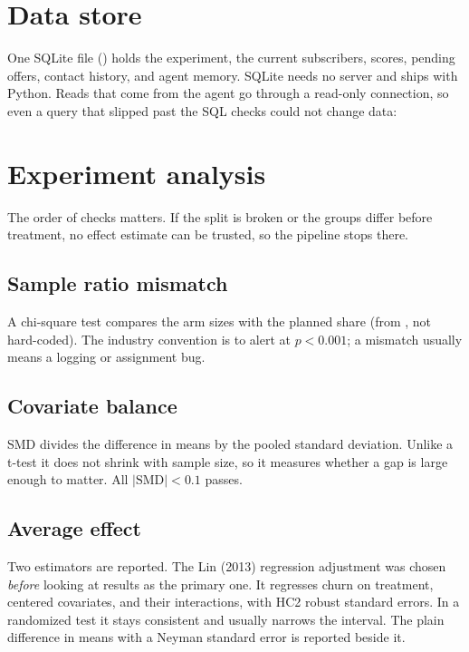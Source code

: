 \documentclass[11pt]{article}
\begin{document}
\section{Data store}
\label{sec:store}
One SQLite file () holds the experiment, the current subscribers, scores, pending offers, contact history, and agent memory. SQLite needs no server and ships with Python. Reads that come from the agent go through a read-only connection, so even a query that slipped past the SQL checks could not change data:


\section{Experiment analysis}
\label{sec:experiment}
The order of checks matters. If the split is broken or the groups differ before treatment, no effect estimate can be trusted, so the pipeline stops there.

\subsection{Sample ratio mismatch}
A chi-square test compares the arm sizes with the planned share (from , not hard-coded). The industry convention is to alert at $p < 0.001$; a mismatch usually means a logging or assignment bug.

\subsection{Covariate balance}
SMD divides the difference in means by the pooled standard deviation. Unlike a t-test it does not shrink with sample size, so it measures whether a gap is large enough to matter. All $|\text{SMD}| < 0.1$ passes.

\subsection{Average effect}
Two estimators are reported. The Lin (2013) regression adjustment was chosen \emph{before} looking at results as the primary one. It regresses churn on treatment, centered covariates, and their interactions, with HC2 robust standard errors. In a randomized test it stays consistent and usually narrows the interval. The plain difference in means with a Neyman standard error is reported beside it.
\end{document}
